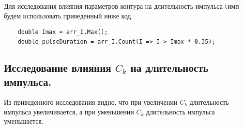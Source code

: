 \documentclass[a4paper,oneside,12pt]{extreport}
\begin{document}
Для исследования влияния параметров контура на длительность импульса tимп
будем использовать приведенный ниже код.

\begin{lstlisting}
    double Imax = arr_I.Max();
    double pulseDuration = arr_I.Count(I => I > Imax * 0.35);
\end{lstlisting}

\subsection{Исследование влияния $C_k$ на длительность импульса.}

Из приведенного исследования видно, что при увеличении $C_k$
длительность импульса увеличивается, а при уменьшении $C_k$
длительность импульса уменьшается.


\begin{figure}[ht!]
\end{figure}

\begin{figure}[ht!]
\end{figure}

\begin{figure}[ht!]
\end{figure}
\end{document}
